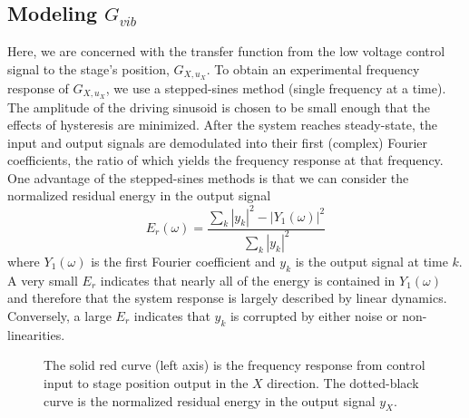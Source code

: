 \documentclass[journal,twocolumn,twoside]{IEEEtran}
\begin{document}
%   
%   

\subsection{Modeling $G_{vib}$}\label{sec:vib_model}
Here, we are concerned with the transfer function from the low voltage control signal to the stage's position, $G_{X,u_X}$. To obtain an experimental frequency response of $G_{X,u_X}$, we use a stepped-sines method (single frequency at a time). The amplitude of the driving sinusoid is chosen to be small enough that the effects of hysteresis are minimized. After the system reaches steady-state, the input and output signals are demodulated into their first (complex) Fourier coefficients, the ratio of which yields the frequency response at that frequency. One advantage of the stepped-sines methods is that we can consider the normalized residual energy in the output signal
\begin{equation}
E_r(\omega) = \frac{\sum_{k} |y_k|^2 - |Y_1(\omega)|^2}{\sum_{k} |y_k|^2}
\end{equation}
where $Y_1(\omega)$ is the first Fourier coefficient and $y_k$ is the output signal at time $k$. A very small $E_r$ indicates that nearly all of the energy is contained in $Y_1(\omega)$ and therefore that the system response is largely described by linear dynamics. Conversely, a large $E_r$ indicates that $y_k$ is corrupted by either noise or non-linearities. 

\begin{figure}
  \centering
  
  \caption{The solid red curve (left axis) is the frequency response from control input to stage position output in the $X$ direction. The dotted-black curve is the normalized residual energy in the output signal $y_X$.}
  \label{fig:Guz2stage_frf}
\end{figure}
\end{document}
